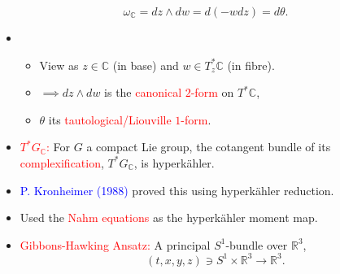 \begin{frame}
    \[
        \omega_{\mathbb{C}} = dz \wedge dw = d(-wdz) = d\theta.
    \]
    \begin{itemize}
        \item 
        \begin{itemize}
            \item View as $z\in \mathbb{C}$ (in base) and $w \in T_{z}^{\ast}\mathbb{C}$ (in fibre).
            \item $\implies dz \wedge dw$ is the \textcolor{red}{canonical $2$-form} on $T^{\ast}\mathbb{C}$,
            \item $\theta$ its \textcolor{red}{tautological/Liouville $1$-form}.
        \end{itemize}
        \item \textcolor{red}{$T^{\ast}G_{\mathbb{C}}$:} For $G$ a compact Lie group, the cotangent bundle of its \textcolor{red}{complexification}, $T^{\ast}G_{\mathbb{C}}$, is hyperk\"ahler.
        \item \textcolor{blue}{P. Kronheimer (1988)} proved this using hyperk\"ahler reduction.
        \item Used the \textcolor{red}{Nahm equations} as the hyperk\"ahler moment map.
    \end{itemize}
\end{frame}

\begin{frame}
    \begin{itemize}
        \item \textcolor{red}{Gibbons-Hawking Ansatz:} A principal $S^{1}$-bundle over $\mathbb{R}^{3}$,
        \[
            (t,x,y,z) \ni S^{1} \times \mathbb{R}^{3} \rightarrow \mathbb{R}^{3}.
        \]
        
    \end{itemize}
\end{frame}